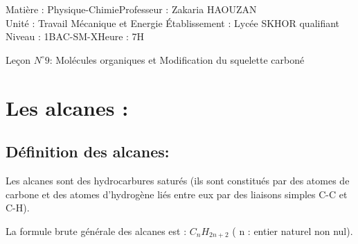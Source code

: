\documentclass[12pt]{article}
\author{Zakaria HAOUZAN}
\date{\today}
\newcommand\headerMe[2]{\noindent{}#1\hfill#2}
\begin{document}
\headerMe{Matière : Physique-Chimie}{Professeur : Zakaria HAOUZAN}\\
\headerMe{Unité : Travail Mécanique et Energie }{Établissement : Lycée SKHOR qualifiant}\\
\headerMe{Niveau : 1BAC-SM-X}{Heure : 7H}\\

\begin{center}

  \Large{Leçon $N^{\circ} 9 $: \color{red} Molécules organiques et Modification du squelette carboné  }
\end{center}







\section{Les alcanes :}
  \subsection{ Définition des alcanes: }
Les alcanes sont des hydrocarbures saturés (ils sont constitués par des atomes de carbone et des atomes d'hydrogène liés entre eux par des liaisons simples C-C et C-H).

  La formule brute générale des alcanes est : $C_nH_{2n+2}$ ( n : entier naturel non nul).
\end{document}
